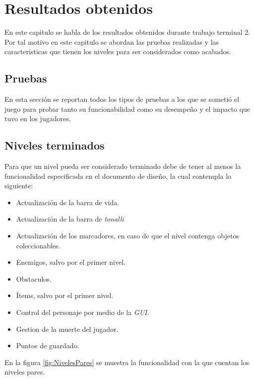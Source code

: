 \chapter{Resultados obtenidos}
En este capitulo se habla de los resultados obtenidos durante trabajo terminal 2. 
Por tal motivo en este capitulo se abordan las pruebas realizadas y las 
caracteristicas que tienen los niveles para ser considerados como acabados.

\section{Pruebas}
En esta sección se reportan todos los tipos de pruebas a los que se sometió el 
juego para probar tanto su funcionabilidad como su desempeño y el impacto que 
tuvo en los jugadores.









%

\section{Niveles terminados}
Para que un nivel pueda ser considerado terminado debe de tener al menos la 
funcionalidad especificada en el documento de diseño, la cual contempla lo 
siguiente: 
\begin{itemize}
	\item Actualización de la barra de vida.
	\item Actualización de la barra de \textit{tonalli}
	\item Actualización de los marcadores, en caso de que el nivel contenga objetos 
	coleccionables.
	\item Enemigos, salvo por el primer nivel.
	\item Obstaculos.
	\item Ítems, salvo por el primer nivel.
	\item Control del personaje por medio de la \textit{GUI}.
	\item Gestion de la muerte del jugador.
	\item Puntos de guardado.
\end{itemize} 

En la figura \ref{fig:NivelesPares} se muestra la funcionalidad con la que cuentan los niveles pares.
		
